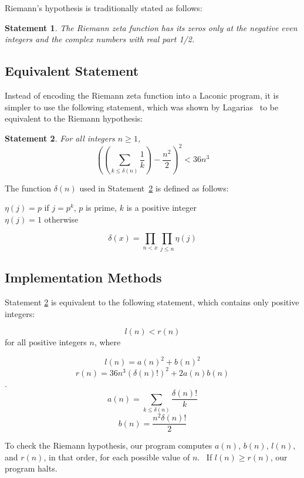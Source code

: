 \documentclass[11pt]{article}
\newtheorem{statement}{Statement}
\newenvironment{nscenter}
 {\parskip=0pt\par\nopagebreak\centering}
 {\par\noindent\ignorespacesafterend}
\begin{document}
Riemann's hypothesis is traditionally stated as follows:

\begin{statement}
\emph{The Riemann zeta function has its zeros only at the negative even integers and the complex numbers with real part 1/2.}
\label{goldbachstatement}
\end{statement}

\subsection{Equivalent Statement}

Instead of encoding the Riemann zeta function into a Laconic program, it is simpler to use the following statement, which was shown by Lagarias~\cite{riemann} to be equivalent to the Riemann hypothesis:

\begin{statement} \label{eq:riemann}
For all integers $n \ge 1$,
$$\left(\left(\sum_{k \le \delta(n)} \frac{1}{k}\right) - \frac{n^2}{2}\right)^2 < 36n^3$$
\end{statement}

The function $\delta(n)$ used in Statement~\ref{eq:riemann} is defined as follows:

\begin{nscenter}
$\eta(j) = p$ if $j = p^k$, $p$ is prime, $k$ is a positive integer \\
$\eta(j) = 1$ otherwise
\end{nscenter}
$$\delta(x) = \prod_{n<x}\prod_{j \le n} \eta(j)$$

\subsection{Implementation Methods}

Statement \ref{eq:riemann} is equivalent to the following statement, which contains only positive integers\footnotemark:

$$l(n) < r(n)$$ for all positive integers $n$, where

$$l(n) = a(n)^2 + b(n)^2$$
$$r(n) = 36n^3(\delta(n)!)^2 + 2a(n)b(n)$$.
$$a(n) = \sum_{k \le \delta(n)} \frac{\delta(n)!}{k}$$
$$b(n) = \frac{n^2 \delta(n)!}{2}$$

To check the Riemann hypothesis, our program computes $a(n)$, $b(n)$, $l(n)$, and $r(n)$, in that order, for each possible value of $n$. \ If $l(n) \ge r(n)$, our program halts.
\end{document}
